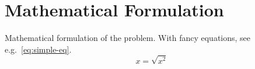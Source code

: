 \section{Mathematical Formulation}
Mathematical formulation of the problem. With fancy equations, see e.g.\
\cref{eq:simple-eq}.
\begin{equation}\label{eq:simple-eq}
  x=\sqrt{x^2}
\end{equation}